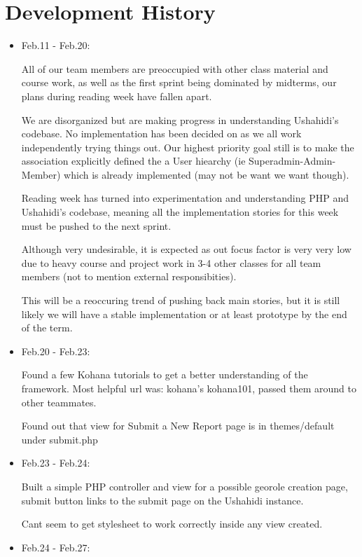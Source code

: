 \documentclass{article}
\begin{document}
\section{Development History}
\begin{itemize}
\item Feb.11 - Feb.20:

All of our team members are preoccupied with other class material and course work, as well as the first sprint being dominated by midterms, our plans during reading week have fallen apart.

We are disorganized but are making progress in understanding Ushahidi's codebase.  No implementation has been decided on as we all work independently trying things out.  Our highest priority goal still is to make the association explicitly defined the a User hiearchy (ie Superadmin-Admin-Member) which is already implemented (may not be want we want though).
		    
Reading week has turned into experimentation and understanding PHP and Ushahidi's codebase, meaning all the implementation stories for this week must be pushed to the next sprint.

Although very undesirable, it is expected as out focus factor is very very low due to heavy course and project work in 3-4 other classes for all team members (not to mention external responsibities).
	     
This will be a reoccuring trend of pushing back main stories, but it is still likely we will have a stable implementation or at least prototype by the end of the term.
	
\item Feb.20 - Feb.23:

Found a few Kohana tutorials to get a better understanding of the framework. Most helpful url was: kohana's kohana101, passed them around to other teammates.

Found out that view for Submit a New Report page is in themes/default under submit.php
	
\item Feb.23 - Feb.24:

Built a simple PHP controller and view for a possible georole creation page, submit button links to the submit page on the Ushahidi instance.
	
Cant seem to get stylesheet to work correctly inside any view created.
	
\item Feb.24 - Feb.27:


\end{itemize}
\end{document}
